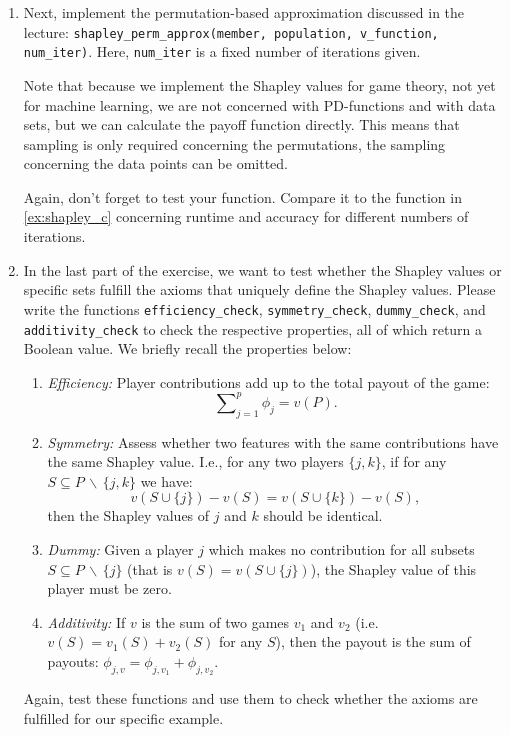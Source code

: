 {\begin{enumerate}
    \item \label{ex:shapley_d}
    Next, implement the permutation-based approximation discussed in the lecture: \texttt{shapley\_perm\_approx(member, population, v\_function, num\_iter)}.
    Here, \texttt{num\_iter} is a fixed number of iterations given.
    
    Note that because we implement the Shapley values for game theory, not yet for machine learning, we are not concerned with PD-functions and with data sets, but we can calculate the payoff function directly.
    This means that sampling is only required concerning the permutations, the sampling concerning the data points can be omitted.

    Again, don't forget to test your function. Compare it to the function in \ref{ex:shapley_c} concerning runtime and accuracy for different numbers of iterations.
    
    \item \label{ex:shapley_e}
    In the last part of the exercise, we want to test whether the Shapley values or specific sets fulfill the axioms that uniquely define the Shapley values.
    Please write the functions \texttt{efficiency\_check}, \texttt{symmetry\_check}, \texttt{dummy\_check}, and \texttt{additivity\_check} to check the respective properties, all of which return a Boolean value.
    We briefly recall the properties below:
    \begin{enumerate}
    
        \item \textit{Efficiency:} Player contributions add up to the total payout of the game:
            $$\sum\nolimits_{j=1}^p\phi_j = v(P).$$
            
        \item \textit{Symmetry:} Assess whether two features with the same contributions have the same Shapley value. I.e., for any two players $\{j,k\}$, if for any $S \subseteq P\, \backslash\, \{j,k\}$ we have:
            $$v(S \cup \{j\}) - v(S) = v(S \cup \{k\}) -  v(S),$$
        then the Shapley values of $j$ and $k$ should be identical.
        
        \item \textit{Dummy:} Given a player $j$ which makes no contribution for all subsets $S \subseteq P \, \backslash\, \{j\}$ (that is $v(S) = v(S \cup \{j\})$), the Shapley value of this player must be zero.
        
        \item \textit{Additivity:} If $v$ is the sum of two games $v_1$ and $v_2$ (i.e. $v(S) = v_1(S) + v_2(S)$ for any $S$), then the payout is the sum of payouts: $\phi_{j,v} = \phi_{j,v_1} + \phi_{j, v_2}$.
        
    \end{enumerate}
    
    Again, test these functions and use them to check whether the axioms are fulfilled for our specific example.
    
\end{enumerate}

}
